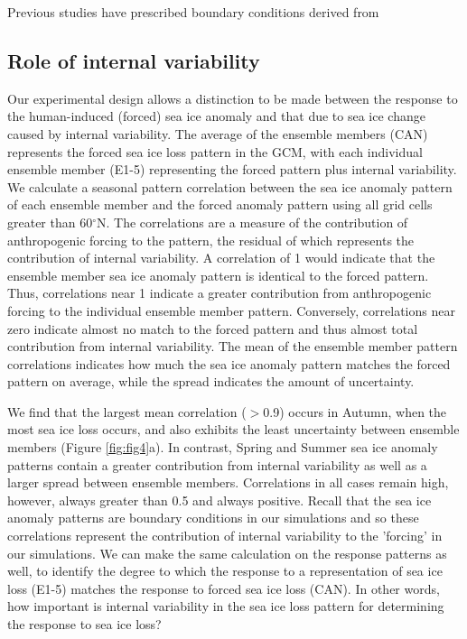 \documentclass[twocol]{ametsoc}
\begin{document}
Previous studies have prescribed boundary conditions derived from


\subsection{Role of internal variability}

Our experimental design allows a distinction to be made between the response to the human-induced (forced) sea ice anomaly and that due to sea ice change caused by internal variability. The average of the ensemble members (CAN) represents the forced sea ice loss pattern in the GCM, with each individual ensemble member (E1-5) representing the forced pattern plus internal variability. We calculate a seasonal pattern correlation between the sea ice anomaly pattern of each ensemble member and the forced anomaly pattern using all grid cells greater than 60$^\circ$N. The correlations are a measure of the contribution of anthropogenic forcing to the pattern, the residual of which represents the contribution of internal variability. A correlation of 1 would indicate that the ensemble member sea ice anomaly pattern is identical to the forced pattern. Thus, correlations near 1 indicate a greater contribution from anthropogenic forcing to the individual ensemble member pattern. Conversely, correlations near zero indicate almost no match to the forced pattern and thus almost total contribution from internal variability. The mean of the ensemble member pattern correlations indicates how much the sea ice anomaly pattern matches the forced pattern on average, while the spread indicates the amount of uncertainty.

We find that the largest mean correlation ($>$0.9) occurs in Autumn, when the most sea ice loss occurs, and also exhibits the least uncertainty between ensemble members (Figure \ref{fig:fig4}a). In contrast, Spring and Summer sea ice anomaly patterns contain a greater contribution from internal variability as well as a larger spread between ensemble members. Correlations in all cases remain high, however, always greater than 0.5 and always positive. Recall that the sea ice anomaly patterns are boundary conditions in our simulations and so these correlations represent the contribution of internal variability to the 'forcing' in our simulations. We can make the same calculation on the response patterns as well, to identify the degree to which the response to a representation of sea ice loss (E1-5) matches the response to forced sea ice loss (CAN). In other words, how important is internal variability in the sea ice loss pattern for determining the response to sea ice loss?
\end{document}
